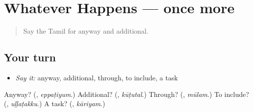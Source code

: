 \section[(dialogue)]{Whatever Happens — once more}

\label{lesson:TA-R399-review-final-399}



\begin{quote}
Say the Tamil for anyway and additional.
\end{quote}

\subsection*{Your turn}
\begin{itemize}
\raggedright
  \item \emph{Say it:} anyway, additional, through, to include, a task
\end{itemize}

\begin{tcolorbox}[breakable,colback=teal!4,colframe=teal!35!black,title={Before you move on}]
Anyway? (\textbf{}, \emph{eppaṭiyum}.) Additional? (\textbf{}, \emph{kūṭutal}.) Through? (\textbf{}, \emph{mūlam}.) To include? (\textbf{}, \emph{uḷḷaṭakku}.) A task? (\textbf{}, \emph{kāriyam}.)
\end{tcolorbox}
